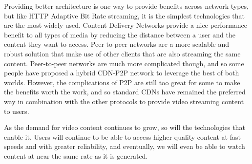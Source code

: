 \documentclass[12pt]{article}
\begin{document}
 Providing better architecture is one way to provide benefits across network types, but like HTTP Adaptive Bit Rate streaming, it is the simplest technologies that are the most widely used.  Content Delivery Networks provide a nice performance benefit to all types of media by reducing the distance between a user and the content they want to access.  Peer-to-peer networks are a more scalable and robust solution that make use of other clients that are also streaming the same content.  Peer-to-peer networks are much more complicated though, and so some people have proposed a hybrid CDN-P2P network to leverage the best of both worlds.  However, the complications of P2P are still too great for some to make the benefits worth the work, and so standard CDNs have remained the preferred way in combination with the other protocols to provide video streaming content to users.

 As the demand for video content continues to grow, so will the technologies that enable it.  Users will continue to be able to access higher quality content at fast speeds and with greater reliability, and eventually, we will even be able to watch content at near the same rate as it is generated.


\clearpage
{}

\end{document}

